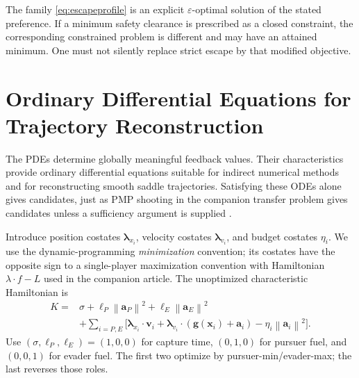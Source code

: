 \documentclass[journal,a4paper]{IEEEtran}
\newcommand{\norm}[1]{\left\|#1\right\|}
\begin{document}
The family \eqref{eq:escapeprofile} is an explicit $\varepsilon$-optimal solution of the stated preference. If a minimum safety clearance is prescribed as a closed constraint, the corresponding constrained problem is different and may have an attained minimum. One must not silently replace strict escape by that modified objective.

\section{Ordinary Differential Equations for Trajectory Reconstruction}
\label{sec:characteristics}
The PDEs determine globally meaningful feedback values. Their characteristics provide ordinary differential equations suitable for indirect numerical methods and for reconstructing smooth saddle trajectories. Satisfying these ODEs alone gives candidates, just as PMP shooting in the companion transfer problem gives candidates unless a sufficiency argument is supplied \cite{Pontryagin1962,OlsinaCompanion}.

Introduce position costates $\boldsymbol\lambda_{x_i}$, velocity costates $\boldsymbol\lambda_{v_i}$, and budget costates $\eta_i$. We use the dynamic-programming \emph{minimization} convention; its costates have the opposite sign to a single-player maximization convention with Hamiltonian $\lambda\cdot f-L$ used in the companion article. The unoptimized characteristic Hamiltonian is
\begin{align}
 K={}&\sigma+\ell_P\norm{\mathbf a_P}^2
                  +\ell_E\norm{\mathbf a_E}^2\nonumber\\
 &+\sum_{i=P,E}\big[\boldsymbol\lambda_{x_i}\cdot\mathbf v_i
   +\boldsymbol\lambda_{v_i}\cdot(\mathbf g(\mathbf x_i)+\mathbf a_i)
   -\eta_i\norm{\mathbf a_i}^2\big].
 \label{eq:canonicalH}
\end{align}
Use $(\sigma,\ell_P,\ell_E)=(1,0,0)$ for capture time, $(0,1,0)$ for pursuer fuel, and $(0,0,1)$ for evader fuel. The first two optimize by pursuer-min/evader-max; the last reverses those roles.
\end{document}
